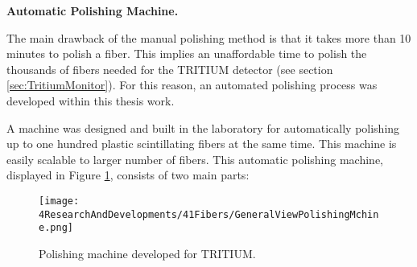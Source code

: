 \textbf{Automatic Polishing Machine.}

The main drawback of the manual polishing method is that it takes more than 10 minutes to polish a fiber. This implies an unaffordable time to polish the thousands of fibers needed for the TRITIUM detector (see section \ref{sec:TritiumMonitor}). For this reason, an automated polishing process was developed within this thesis work. 


A machine was designed and built in the laboratory for automatically polishing up to one hundred plastic scintillating fibers at the same time. This machine is easily scalable to larger number of fibers. This automatic polishing machine, displayed in Figure \ref{fig:GeneralViewPolishingMachine}, consists of two main parts:

\begin{figure}[h]
\centering
\texttt{[image: 4ResearchAndDevelopments/41Fibers/GeneralViewPolishingMchine.png]}
\caption{Polishing machine developed for TRITIUM.\label{fig:GeneralViewPolishingMachine}}
\end{figure}


